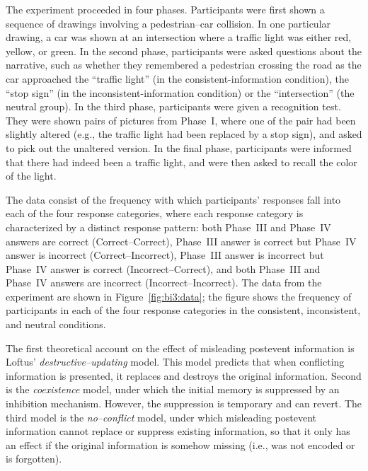 The experiment proceeded in four phases. Participants were first shown a sequence of drawings involving a pedestrian--car collision. In one particular drawing, a car was shown at an intersection where a traffic light was either red, yellow, or green. In the second phase, participants were asked questions about the narrative, such as whether they remembered a pedestrian crossing the road as the car approached the ``traffic light'' (in the consistent-information condition), the ``stop sign'' (in the inconsistent-information condition) or the ``intersection'' (the neutral group). In the third phase, participants were given a recognition test. They were shown pairs of pictures from Phase~I, where one of the pair had been slightly altered (e.g., the traffic light had been replaced by a stop sign), and asked to pick out the unaltered version. In the final phase, participants were informed that there had indeed been a traffic light, and were then asked to recall the color of the light. 

{The data consist of the frequency {with which participants' responses fall into each of} the four response categories, where each response category is characterized by a distinct response pattern: both Phase~III and Phase~IV answers are correct (Correct--Correct), Phase~III answer is correct but Phase~IV answer is incorrect (Correct--Incorrect), Phase~III answer is incorrect but Phase~IV answer is correct (Incorrect--Correct), and both Phase~III and Phase~IV answers are incorrect (Incorrect--Incorrect). The data from the  experiment are shown in Figure~\ref{fig:bi3:data}; the figure shows the frequency of participants in each of the four response categories in the consistent, inconsistent, and neutral conditions.} 

The first theoretical account on the effect of misleading postevent information is Loftus' \emph{destructive--updating} model. This model predicts that when conflicting information is presented, it replaces and destroys the original information. Second is the \emph{coexistence} model, under which the initial memory is suppressed by an inhibition mechanism. However, the suppression is temporary and can revert. The third model is the \emph{no--conflict} model, under which misleading postevent information cannot replace or suppress existing information, so that it only has an effect if the original information is somehow missing (i.e., was not encoded or is forgotten).


